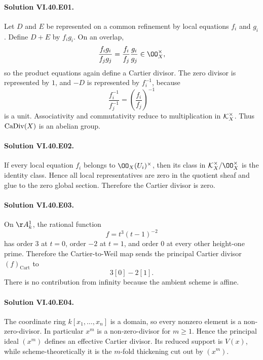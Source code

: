 
\paragraph{Solution VI.40.E01.}
Let \(D\) and \(E\) be represented on a common refinement by local equations \(f_i\) and \(g_i\).  Define \(D+E\) by \(f_i g_i\).  On an overlap,
\[
\frac{f_i g_i}{f_j g_j}=\frac{f_i}{f_j}\frac{g_i}{g_j}\in\OO_X^\times,
\]
so the product equations again define a Cartier divisor.  The zero divisor is represented by \(1\), and \(-D\) is represented by \(f_i^{-1}\), because
\[
\frac{f_i^{-1}}{f_j^{-1}}=\left(\frac{f_i}{f_j}\right)^{-1}
\]
is a unit.  Associativity and commutativity reduce to multiplication in \(\mathcal{K}_X^\times\).  Thus \(\operatorname{CaDiv}(X)\) is an abelian group.

\paragraph{Solution VI.40.E02.}
If every local equation \(f_i\) belongs to \(\OO_X(U_i)^\times\), then its class in \(\KX^\times/\OO_X^\times\) is the identity class.  Hence all local representatives are zero in the quotient sheaf and glue to the zero global section.  Therefore the Cartier divisor is zero.

\paragraph{Solution VI.40.E03.}
On \(\AA^1_k\), the rational function
\[
f=t^3(t-1)^{-2}
\]
has order \(3\) at \(t=0\), order \(-2\) at \(t=1\), and order \(0\) at every other height-one prime.  Therefore the Cartier-to-Weil map sends the principal Cartier divisor \((f)_{\mathrm{Cart}}\) to
\[
3[0]-2[1].
\]
There is no contribution from infinity because the ambient scheme is affine.

\paragraph{Solution VI.40.E04.}
The coordinate ring \(k[x_1,\ldots,x_n]\) is a domain, so every nonzero element is a non-zero-divisor.  In particular \(x^m\) is a non-zero-divisor for \(m\ge1\).  Hence the principal ideal \((x^m)\) defines an effective Cartier divisor.  Its reduced support is \(V(x)\), while scheme-theoretically it is the \(m\)-fold thickening cut out by \((x^m)\).


